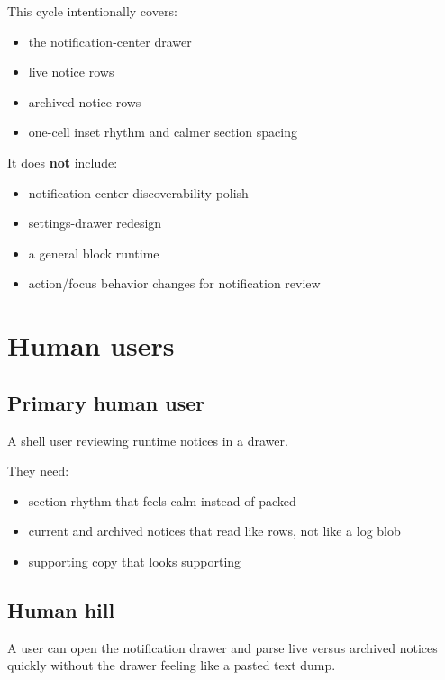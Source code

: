 This cycle intentionally covers:

\begin{itemize}
\tightlist
\item
  the notification-center drawer
\item
  live notice rows
\item
  archived notice rows
\item
  one-cell inset rhythm and calmer section spacing
\end{itemize}

It does \textbf{not} include:

\begin{itemize}
\tightlist
\item
  notification-center discoverability polish
\item
  settings-drawer redesign
\item
  a general block runtime
\item
  action/focus behavior changes for notification review
\end{itemize}

\section{Human users}\label{record-171-human-users}

\subsection{Primary human user}\label{record-171-primary-human-user}

A shell user reviewing runtime notices in a drawer.

They need:

\begin{itemize}
\tightlist
\item
  section rhythm that feels calm instead of packed
\item
  current and archived notices that read like rows, not like a log blob
\item
  supporting copy that looks supporting
\end{itemize}

\subsection{Human hill}\label{record-171-human-hill}

A user can open the notification drawer and parse live versus archived notices quickly without the drawer feeling like a pasted text dump.

